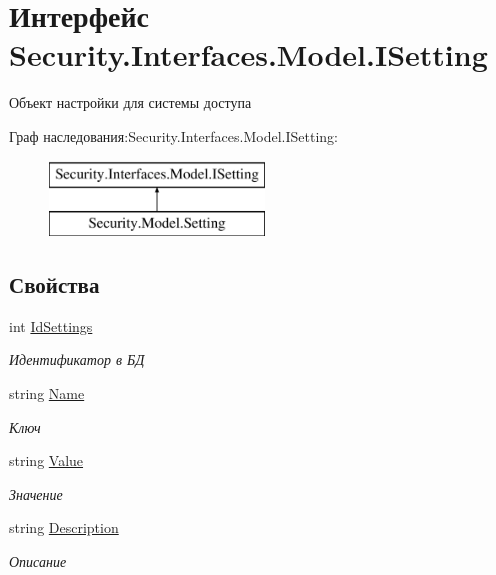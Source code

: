 \hypertarget{interface_security_1_1_interfaces_1_1_model_1_1_i_setting}{}\section{Интерфейс Security.\+Interfaces.\+Model.\+I\+Setting}
\label{interface_security_1_1_interfaces_1_1_model_1_1_i_setting}


Объект настройки для системы доступа  


Граф наследования\+:Security.\+Interfaces.\+Model.\+I\+Setting\+:\begin{figure}[H]
\begin{center}
\leavevmode
\includegraphics[height=2.000000cm]{d3/d3e/interface_security_1_1_interfaces_1_1_model_1_1_i_setting}
\end{center}
\end{figure}
\subsection*{Свойства}
\begin{DoxyCompactItemize}
\item 
int \hyperlink{interface_security_1_1_interfaces_1_1_model_1_1_i_setting_a66f279e460a9dfa950b65f5652c7f154}{Id\+Settings}
\begin{DoxyCompactList}\small\item\em Идентификатор в БД \end{DoxyCompactList}\item 
string \hyperlink{interface_security_1_1_interfaces_1_1_model_1_1_i_setting_acff8c6ad9aab9374cd6ed1d2cd18d18c}{Name}
\begin{DoxyCompactList}\small\item\em Ключ \end{DoxyCompactList}\item 
string \hyperlink{interface_security_1_1_interfaces_1_1_model_1_1_i_setting_ac1b29dd176e0389099fd1ce78e35f6b8}{Value}
\begin{DoxyCompactList}\small\item\em Значение \end{DoxyCompactList}\item 
string \hyperlink{interface_security_1_1_interfaces_1_1_model_1_1_i_setting_a2885d9aa1c5ff73e76a0c242642fc5c0}{Description}
\begin{DoxyCompactList}\small\item\em Описание \end{DoxyCompactList}\end{DoxyCompactItemize}


